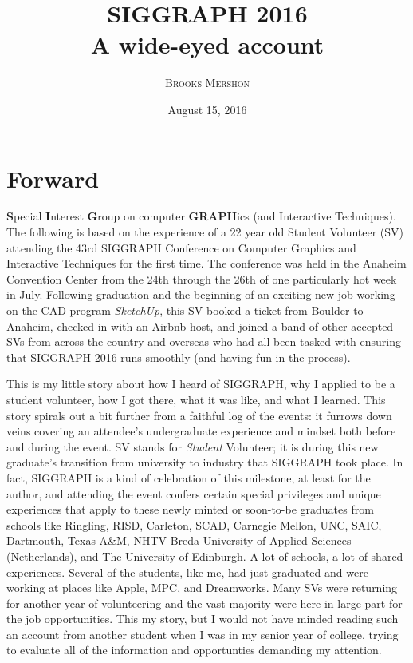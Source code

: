 \documentclass[a4paper, 11pt]{article} %
\title{\textbf{SIGGRAPH 2016}\\ %
A wide-eyed account} %
\author{\textsc{Brooks Mershon}} %
\date{August 15, 2016} %
\begin{document}
\maketitle %

\eject


\renewcommand{\abstractname}{Forward} %

\section*{Forward}
	
\textbf{S}pecial \textbf{I}nterest \textbf{G}roup on computer \textbf{GRAPH}ics (and Interactive Techniques). The following is based on the experience of a 22 year old Student Volunteer (SV) attending the 43rd SIGGRAPH Conference on Computer Graphics and Interactive Techniques for the first time. The conference was held in the Anaheim Convention Center from the 24th through the 26th of one particularly hot week in July. Following graduation and the beginning of an exciting new job working on the CAD program \textit{SketchUp}, this SV booked a ticket from Boulder to Anaheim, checked in with an Airbnb host, and joined a band of other accepted SVs from across the country and overseas who had all been tasked with ensuring that SIGGRAPH 2016 runs smoothly (and having fun in the process).

This is my little story about how I heard of SIGGRAPH, why I applied to be a student volunteer, how I got there, what it was like, and what I learned. This story spirals out a bit further from a faithful log of the events: it furrows down veins covering an attendee's undergraduate experience and mindset both before and during the event. SV stands for \textit{Student} Volunteer; it is during this new graduate's transition from university to industry that SIGGRAPH took place. In fact, SIGGRAPH is a kind of celebration of this milestone, at least for the author, and attending the event confers certain special privileges and unique experiences that apply to these newly minted or soon-to-be graduates from schools like Ringling, RISD, Carleton, SCAD, Carnegie Mellon, UNC, SAIC, Dartmouth, Texas A\&M, NHTV Breda University of Applied Sciences (Netherlands), and The University of Edinburgh. A lot of schools, a lot of shared experiences. Several of the students, like me, had just graduated and were working at places like Apple, MPC, and Dreamworks. Many SVs were returning for another year of volunteering and the vast majority were here in large part for the job opportunities. This my story, but I would not have minded reading such an account from another student when I was in my senior year of college, trying to evaluate all of the information and opportunties demanding my attention.
\end{document}
